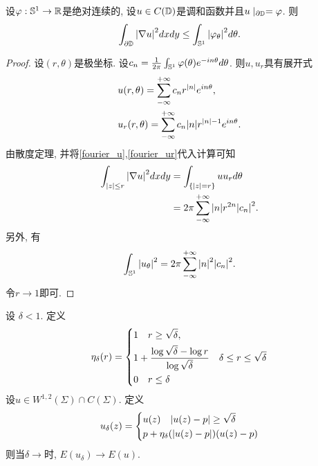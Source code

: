 \begin{lemma} \label{boundary_energy}
    设${\varphi}: \mathbb{S}^1 \to {\mathbb{R}}$是绝对连续的,  设$u\in C({\mathbb{D}})$是调和函数并且$u\mid_{{\partial} {\mathbb{D}}}={\varphi}$. 则
    \begin{equation}
        \int_{{\partial} {\mathbb{D}}} {\left | \nabla u \right |}^2dxdy \le \int_{\mathbb{S}^1} {\left | {\varphi}_\theta \right |}^2d\theta.
    \end{equation}
\end{lemma}
\begin{proof}
    设$(r,\theta)$是极坐标. 设$c_n={{\frac{1}{2\pi}}}\int_{\mathbb{S}^1} {\varphi}(\theta)e^{-i n \theta}d\theta$. 则$u, u_r$具有展开式
    \begin{align}
        &u(r,\theta)=\sum_{-\infty}^{+\infty}c_n r^{{\left | n \right |}}e^{in\theta}, \label{fourier_u} \\
        &u_r(r,\theta)=\sum_{-\infty}^{+\infty}c_n{\left | n \right |} r^{{\left | n \right |}-1}e^{in\theta}. \label{fourier_ur}\\
    \end{align}
    由散度定理, 并将\eqref{fourier_u},\eqref{fourier_ur}代入计算可知
    \begin{equation}
        \begin{split}
            \int_{{{\left | z \right |}\le r}}{\left | \nabla u \right |}^2dxdy & =\int_{\{{\left | z \right |}=r\}}uu_rd\theta\\
            &=2\pi \sum_{-\infty}^{+\infty}{\left | n \right |}r^{2n}{\left | c_n \right |}^2.
        \end{split}
    \end{equation}
    另外, 有
    \begin{equation}
        \int_{\mathbb{S}^1} {\left | u_\theta \right |}^2 = 2\pi\sum_{-\infty}^{+\infty} {\left | n \right |}^2{\left | c_n \right |}^2.
    \end{equation}
    令$r \to 1$即可.
\end{proof}
\begin{lemma} \label{fill_hole}
    设 $\delta <1$. 定义
    \begin{equation}
        \eta_\delta(r)=\left\{
            \begin{aligned}
                &1 {\quad} r \ge \sqrt{\delta}, \\
                &1+\frac{\log \sqrt{\delta}- \log r}{ \log \sqrt{\delta}} {\quad} \delta \le r \le \sqrt{\delta}\\
                &0 {\quad} r \le \delta
            \end{aligned}
            \right.
    \end{equation}
    设$u \in W^{1,2}(\Sigma) \cap C(\Sigma)$. 定义
    \begin{equation}
        u_\delta(z)=\left\{
            \begin{aligned}
                & u(z) {\quad} {\left | u(z)-p \right |} \ge \sqrt{\delta} \\
                & p+ \eta_\delta({\left | u(z)-p \right |})(u(z)-p)
            \end{aligned}
        \right.
    \end{equation}
    则当$\delta \to $时, $E(u_\delta) \to E(u)$.
\end{lemma}
